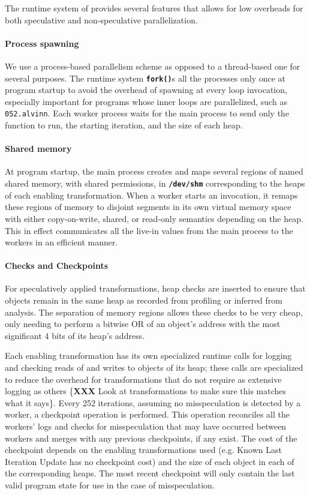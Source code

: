The runtime system of \name provides several features that allows for
low overheads for both speculative and non-speculative parallelization.

\paragraph{Process spawning}
We use a process-based parallelism scheme as opposed to a thread-based one
for several purposes. The runtime system \texttt{\textbf{fork()}}s all the processes
only once at program startup to avoid the overhead of spawning at every loop
invocation, especially important for programs whose inner loops are
parallelized, such as \texttt{052.alvinn}. Each worker process waits for the main
process to send only the function to run, the starting iteration, and the
size of each heap.

\paragraph{Shared memory}
At program startup, the main process creates and maps several regions of named shared
memory, with shared permissions, in \texttt{\textbf{/dev/shm}} corresponding
to the heaps of each enabling transformation.
When a worker starts an invocation, it remaps these regions of memory to
disjoint segments in its own virtual memory space with either
copy-on-write, shared, or read-only semantics depending on the heap.
This in effect communicates all the live-in values from the
main process to the workers in an efficient manner.

\paragraph{Checks and Checkpoints}
For speculatively applied transformations, heap checks are inserted to
ensure that objects remain in the same heap as recorded from profiling or
inferred from analysis. The separation of memory regions allows these
checks to be very cheap, only needing to perform a bitwise OR of an
object's address with the most significant 4 bits of its heap's address.

Each enabling transformation has its own specialized runtime calls for logging
and checking reads of and writes to objects of its heap; these calls are
specialized to reduce the overhead for transformations that do not require
as extensive logging as others \{\textbf{XXX} Look at transformations to
make sure this matches what it says\}. Every 252 iterations, assuming no
misspeculation is detected by a worker, a checkpoint operation is performed.
This operation reconciles all the workers' logs and checks for
misspeculation that may have occurred between workers and merges with any
previous checkpoints, if any exist. The cost of the checkpoint depends on
the enabling transformations used (e.g. Known Last Iteration Update has no
checkpoint cost) and the size of each object in each of the corresponding heaps.
The most recent checkpoint will only contain the last valid program state
for use in the case of misspeculation.

